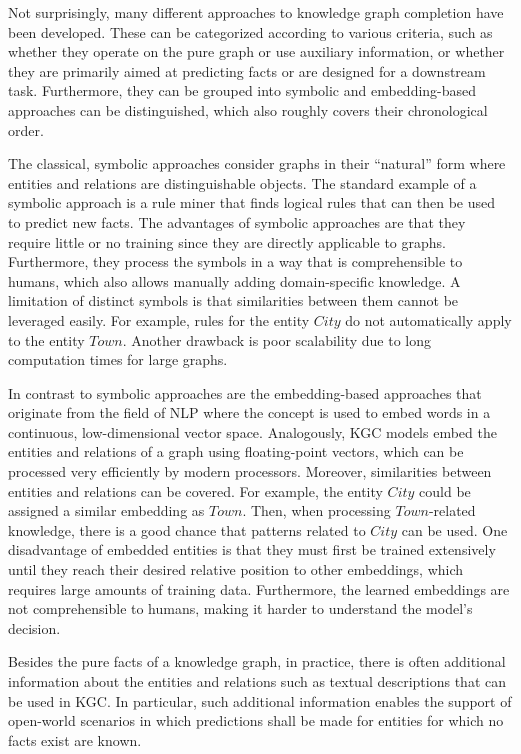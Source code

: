 Not surprisingly, many different approaches to knowledge graph completion have been developed. These can be categorized according to various criteria, such as whether they operate on the pure graph or use auxiliary information, or whether they are primarily aimed at predicting facts or are designed for a downstream task. Furthermore, they can be grouped into symbolic and embedding-based approaches can be distinguished, which also roughly covers their chronological order.

The classical, symbolic approaches consider graphs in their ``natural'' form where entities and relations are distinguishable objects. The standard example of a symbolic approach is a rule miner that finds logical rules that can then be used to predict new facts. The advantages of symbolic approaches are that they require little or no training since they are directly applicable to graphs. Furthermore, they process the symbols in a way that is comprehensible to humans, which also allows manually adding domain-specific knowledge. A limitation of distinct symbols is that similarities between them cannot be leveraged easily. For example, rules for the entity $City$ do not automatically apply to the entity $Town$. Another drawback is poor scalability due to long computation times for large graphs.

In contrast to symbolic approaches are the embedding-based approaches that originate from the field of NLP where the concept is used to embed words in a continuous, low-dimensional vector space. Analogously, KGC models embed the entities and relations of a graph using floating-point vectors, which can be processed very efficiently by modern processors. Moreover, similarities between entities and relations can be covered. For example, the entity $City$ could be assigned a similar embedding as $Town$. Then, when processing $Town$-related knowledge, there is a good chance that patterns related to $City$ can be used. One disadvantage of embedded entities is that they must first be trained extensively until they reach their desired relative position to other embeddings, which requires large amounts of training data. Furthermore, the learned embeddings are not comprehensible to humans, making it harder to understand the model's decision.

Besides the pure facts of a knowledge graph, in practice, there is often additional information about the entities and relations such as textual descriptions that can be used in KGC. In particular, such additional information enables the support of open-world scenarios in which predictions shall be made for entities for which no facts exist are known.

